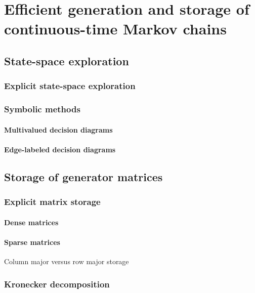 \chapter{Efficient generation and storage of continuous-time Markov chains}
\label{chap:generation_storage}

\section{State-space exploration}

\subsection{Explicit state-space exploration}

\subsection{Symbolic methods}

\subsubsection{Multivalued decision diagrams}

\subsubsection{Edge-labeled decision diagrams}

\section{Storage of generator matrices}

\subsection{Explicit matrix storage}

\subsubsection{Dense matrices}

\subsubsection{Sparse matrices}

Column major versus row major storage

\subsection{Kronecker decomposition}

